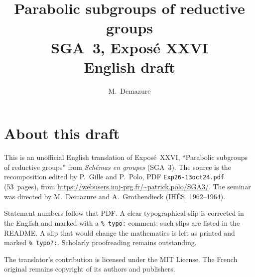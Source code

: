 \documentclass[11pt,a4paper,oneside]{amsbook}
\title[SGA~3, Expos\'e XXVI (English draft)]{Parabolic subgroups of reductive groups\\
{\normalsize SGA~3, Expos\'e XXVI\\English draft}}
\author{M.\ Demazure}
\date{}
\begin{document}
\frontmatter
\maketitle

\chapter*{About this draft}
This is an unofficial English translation of Expos\'e~XXVI, ``Parabolic subgroups of reductive groups''
from \textit{Sch\'emas en groupes} (SGA~3).
The source is the recomposition edited by P.~Gille and P.~Polo,
PDF \texttt{Exp26-13oct24.pdf} (53~pages),
from \url{https://webusers.imj-prg.fr/~patrick.polo/SGA3/}.
The seminar was directed by M.~Demazure and A.~Grothendieck
(IH\'ES, 1962--1964).

Statement numbers follow that PDF. A clear typographical slip is
corrected in the English and marked with a \texttt{\% typo:} comment;
such slips are listed in the README. A slip that would change the
mathematics is left as printed and marked \texttt{\% typo?:}.
Scholarly proofreading remains outstanding.

The translator's contribution is licensed under the MIT License.
The French original remains copyright of its authors and publishers.

\tableofcontents
\mainmatter









\end{document}
